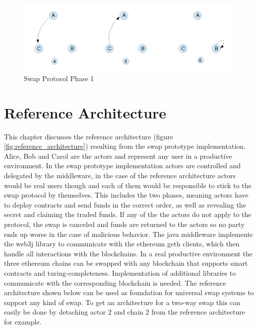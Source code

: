 \begin{figure}[h]
	\begin{center}
		\includegraphics[width=0.6\paperwidth]{phase1}
		\caption{Swap Protocol Phase 1}
		\label{fig:phase1}
	\end{center}
\end{figure}

\clearpage


\section{Reference Architecture}
\label{sec:chapter04:ref_architecture}

This chapter discusses the reference architecture (figure \ref{fig:reference_architecture}) resulting from the swap prototype implementation. Alice, Bob and Carol are the actors and represent any user in a productive environment. In the swap prototype implementation actors are controlled and delegated by the middleware, in the case of the reference architecture actors would be real users though and each of them would be responsible to stick to the swap protocol by themselves. This includes the two phases, meaning actors have to deploy contracts and send funds in the correct order, as well as revealing the secret and claiming the traded funds. If any of the the actors do not apply to the protocol, the swap is canceled and funds are returned to the actors so no party ends up worse in the case of malicious behavior. The java middleware implements the web3j library to communicate with the ethereum geth clients, which then handle all interactions with the blockchains. In a real productive environment the three ethereum chains can be swapped with any blockchain that supports smart contracts and turing-completeness. Implementation of additional libraries to communicate with the corresponding blockchain is needed. The reference architecture shown below can be used as foundation for universal swap systems to support any kind of swap. To get an architecture for a two-way swap this can easily be done by detaching actor 2 and chain 2 from the reference architecture for example. \newline \newline

